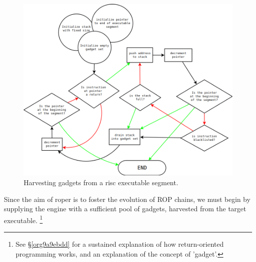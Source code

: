 \documentclass[12pt,glossary]{dalthesis}
\begin{document}
\begin{figure}[htbp]
\centering
\includegraphics[width=.9\linewidth]{../images/gadget-harvest-dark.png}
\caption{\label{fig:org685ee5d}
Harvesting gadgets from a \gls{risc} executable segment.}
\end{figure}

Since the aim of \gls{roper} is to foster the evolution of ROP chains, we 
must begin by supplying the engine with a sufficient pool of gadgets, 
harvested from the target executable. 
  \footnote{See \S \ref{org9a9ebdd} for a sustained explanation of how return-oriented
  programming works, and an explanation of the concept of 'gadget'.}
\end{document}

